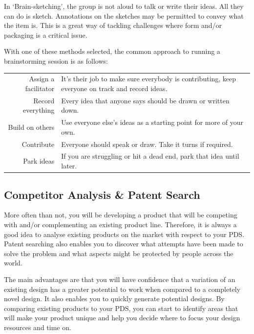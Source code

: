 In `Brain-sketching', the group is not aloud to talk or write their ideas. All they can do is sketch. Annotations on the sketches may be permitted to convey what the item is. This is a great way of tackling challenges where form and/or packaging is a critical issue. 

With one of these methods selected, the common approach to running a brainstorming session is as follows:

\begin{table}
  \small
  \begin{tabular}{r p{}}
    Assign a facilitator & It's their job to make sure everybody is contributing, keep everyone on track and record ideas. \\
    Record everything & Every idea that anyone says should be drawn or written down. \\
    Build on others & Use everyone else's ideas as a starting point for more of your own. \\
    Contribute & Everyone should speak or draw.  Take it turns if required. \\
    Park ideas & If you are struggling or hit a dead end, park that idea until later. \\
  \end{tabular}
\end{table}


\subsection{Competitor Analysis \& Patent Search}

More often than not, you will be developing a product that will be competing with and/or complementing an existing product line. Therefore, it is always a good idea to analyse existing products on the market with respect to your \ac{PDS}.  Patent searching also enables you to discover what attempts have been made to solve the problem and what aspects might be protected by people across the world.

The main advantages are that you will have confidence that a variation of an existing design has a greater potential to work when compared to a completely novel design. It also enables you to quickly generate potential designs. By comparing existing products to your PDS, you can start to identify areas that will make your product unique and help you decide where to focus your design resources and time on.

